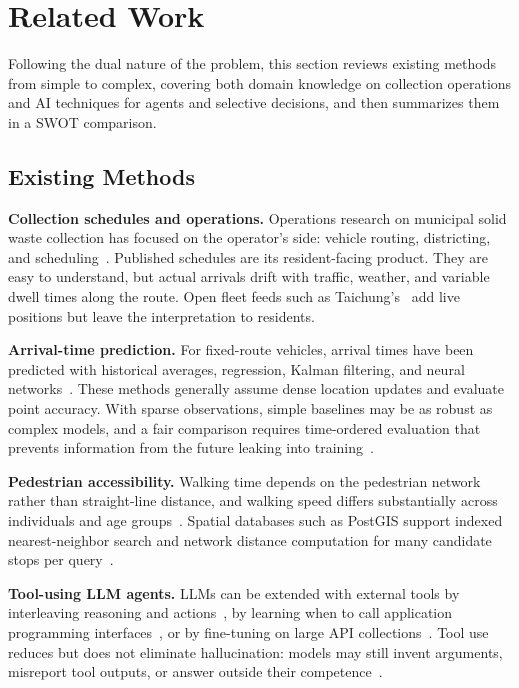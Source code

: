 \section{Related Work}\label{sec:related}

Following the dual nature of the problem, this section reviews existing methods from simple to complex, covering both domain knowledge on collection operations and AI techniques for agents and selective decisions, and then summarizes them in a SWOT comparison.

\subsection{Existing Methods}
\textbf{Collection schedules and operations.} Operations research on municipal solid waste collection has focused on the operator's side: vehicle routing, districting, and scheduling~\cite{belien2014}. Published schedules are its resident-facing product. They are easy to understand, but actual arrivals drift with traffic, weather, and variable dwell times along the route. Open fleet feeds such as Taichung's~\cite{taichung_fleet_api} add live positions but leave the interpretation to residents.

\textbf{Arrival-time prediction.} For fixed-route vehicles, arrival times have been predicted with historical averages, regression, Kalman filtering, and neural networks~\cite{chien2002,jeong2004}. These methods generally assume dense location updates and evaluate point accuracy. With sparse observations, simple baselines may be as robust as complex models, and a fair comparison requires time-ordered evaluation that prevents information from the future leaking into training~\cite{tashman2000,hyndman2021}.

\textbf{Pedestrian accessibility.} Walking time depends on the pedestrian network rather than straight-line distance, and walking speed differs substantially across individuals and age groups~\cite{knoblauch1996}. Spatial databases such as PostGIS support indexed nearest-neighbor search and network distance computation for many candidate stops per query~\cite{postgis}.

\textbf{Tool-using LLM agents.} LLMs can be extended with external tools by interleaving reasoning and actions~\cite{yao2023react}, by learning when to call application programming interfaces~\cite{schick2023toolformer}, or by fine-tuning on large API collections~\cite{patil2023gorilla}. Tool use reduces but does not eliminate hallucination: models may still invent arguments, misreport tool outputs, or answer outside their competence~\cite{ji2023hallucination}.

